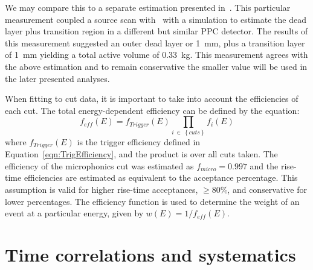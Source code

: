 	We may compare this to a separate estimation presented in~\cite{Aalseth:2010aa}.  This particular measurement coupled a source scan with \amtwofourone~with a simulation to estimate the dead layer plus transition region in a different but similar PPC detector.  The results of this measurement suggested an outer dead layer or 1~mm, plus a transition layer of 1~mm yielding a total active volume of 0.33~kg.  This measurement agrees with the above estimation and to remain conservative the smaller value will be used in the later presented analyses.
	
	When fitting to cut data, it is important to take into account the efficiencies of each cut.  The total energy-dependent efficiency can be defined by the equation:
		\begin{equation}
		f_{eff}(E) = f_{Trigger}(E) \prod_{i~\in~\left\{cuts\right\}} f_{i}(E)		
		\label{eqn:EfficiencyEquation}
		\end{equation}
where $f_{Trigger}(E)$ is the trigger efficiency defined in Equation~\ref{eqn:TrigEfficiency}, and the product is over all cuts taken.  The efficiency of the microphonics cut was estimated as $f_{micro} = 0.997$ and the rise-time efficiencies are estimated as equivalent to the acceptance percentage.  This assumption is valid for higher rise-time acceptances, $\ge80$\%, and conservative for lower percentages.  The efficiency function is used to determine the weight of an event at a particular energy, given by $w(E) = 1/f_{eff}(E)$.

	\section{Time correlations and systematics}
	\label{sec:BeGeTimeCorrelations}

